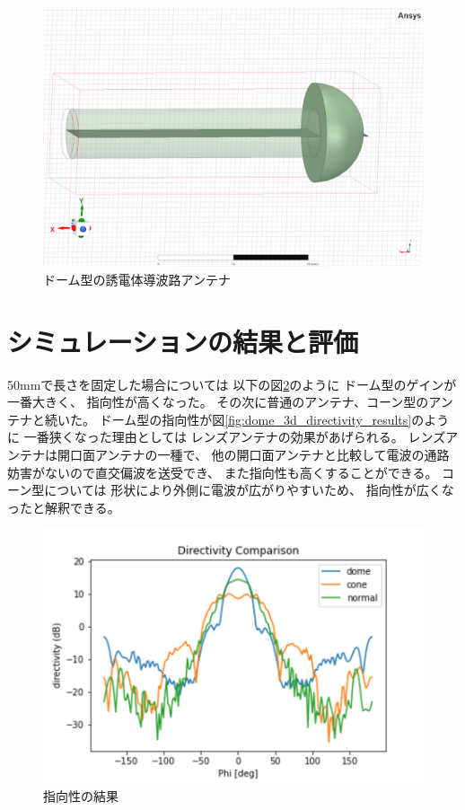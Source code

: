 \documentclass[technicalreport]{ieicej}
\begin{document}
\begin{figure}[tb]
  \begin{center}
    \includegraphics[bb=0 0 384 262, width=0.7\linewidth]{img/dome.pdf}
    \caption{ドーム型の誘電体導波路アンテナ}
    \label{fig:dome}
  \end{center}
\end{figure}

\section{シミュレーションの結果と評価}

50mmで長さを固定した場合については
以下の図\ref{fig:directivity_results}のように
ドーム型のゲインが一番大きく、
指向性が高くなった。
その次に普通のアンテナ、コーン型のアンテナと続いた。
ドーム型の指向性が図\ref{fig:dome_3d_directivity_results}のように
一番狭くなった理由としては
レンズアンテナの効果があげられる。
レンズアンテナは開口面アンテナの一種で、
他の開口面アンテナと比較して電波の通路妨害がないので直交偏波を送受でき、
また指向性も高くすることができる。
コーン型については
形状により外側に電波が広がりやすいため、
指向性が広くなったと解釈できる。

\begin{figure}[tb]
  \begin{center}
    \includegraphics[bb=0.000000 0.000000 432.098422 288.065615, width=1.0\linewidth]{img/directivity_comparison.pdf}
    \caption{指向性の結果}
    \label{fig:directivity_results}
  \end{center}
\end{figure}
\end{document}
